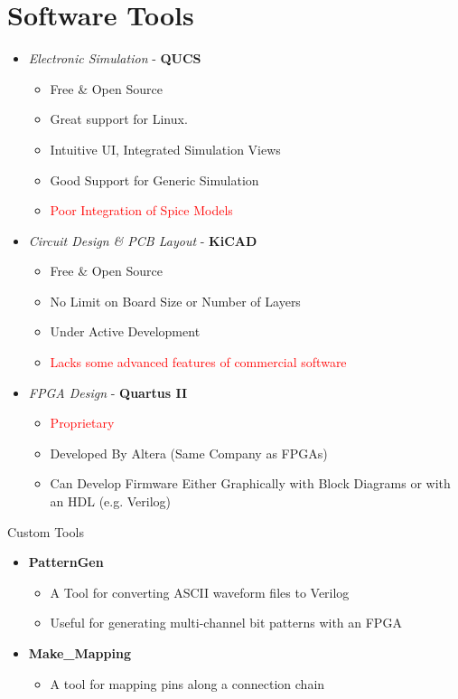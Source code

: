 \documentclass{beamer}
\newcommand{\pro}[1]{\textcolor{drkgreen}{#1}}
\newcommand{\con}[1]{\textcolor{red}{#1}}
\begin{document}
\section{Software Tools}
\begin{frame}
  \begin{itemize}
    \item \emph{Electronic Simulation} \-- \textbf{QUCS}
      \begin{itemize}
        \item \pro{Free \& Open Source}
        \item \pro{Great support for Linux.}
        \item \pro{Intuitive UI, Integrated Simulation Views}
        \item \pro{Good Support for Generic Simulation}
        \item \con{Poor Integration of Spice Models}
      \end{itemize}
    \item \emph{Circuit Design \& PCB Layout} \-- \textbf{KiCAD}
      \begin{itemize}
        \item \pro{Free \& Open Source}
        \item \pro{No Limit on Board Size or Number of Layers}
        \item \pro{Under Active Development}
        \item \con{Lacks some advanced features of commercial software}
      \end{itemize}
    \item \emph{FPGA Design} \-- \textbf{Quartus II}
      \begin{itemize}
        \item \con{Proprietary}
        \item \pro{Developed By Altera (Same Company as FPGAs)}
        \item \pro{Can Develop Firmware Either Graphically with Block Diagrams or with an HDL (e.g. Verilog)}
      \end{itemize}
  \end{itemize}
\end{frame}

\begin{frame}{Custom Tools}
  \begin{itemize}
    \item \textbf{PatternGen}
      \begin{itemize}
        \item A Tool for converting ASCII waveform files to Verilog
        \item Useful for generating multi-channel bit patterns with an FPGA
      \end{itemize}
    \item \textbf{Make\_Mapping}
      \begin{itemize}
        \item A tool for mapping pins along a connection chain
      \end{itemize}
  \end{itemize}
  \vspace{0.5in}
\end{frame}
\end{document}
